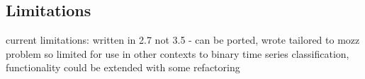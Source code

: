     \subsection{Limitations}
    \label{subsec:pl-mozzpy-limit}
        \begin{sitemize}
            \item{current limitations: written in 2.7 not 3.5 - can be ported, wrote tailored to mozz problem so limited for use in other contexts to binary time series classification, functionality could be extended with some refactoring}
        \end{sitemize}

